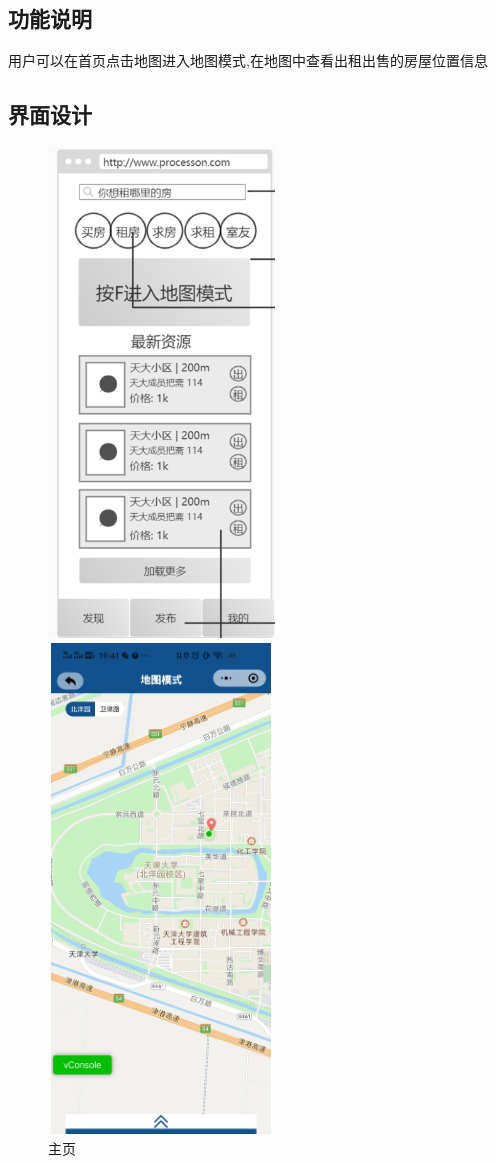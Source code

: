 \subsection{功能说明}
用户可以在首页点击地图进入地图模式,在地图中查看出租出售的房屋位置信息
\subsection{界面设计}
\begin{figure}[htbp]
    \centering
    \begin{minipage}[t]{0.48\textwidth}
    \centering
    \includegraphics[width=6cm,height=13cm]{design/image/zhuye.png} 
    \caption{主页}
    \end{minipage}
    \begin{minipage}[t]{0.48\textwidth}
    \centering
    \includegraphics[width=6cm,height=13cm]{design/image/ditu2.png}

\end{minipage}
\end{figure}

